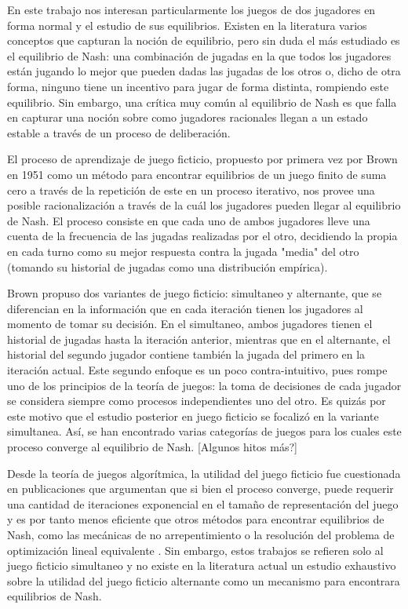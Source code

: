 En este trabajo nos interesan particularmente los juegos de dos jugadores en forma normal y el estudio de sus equilibrios. Existen en la literatura varios conceptos que capturan la noción de equilibrio, pero sin duda el más estudiado es el equilibrio de Nash: una combinación de jugadas en la que todos los jugadores están jugando lo mejor que pueden dadas las jugadas de los otros o, dicho de otra forma, ninguno tiene un incentivo para jugar de forma distinta, rompiendo este equilibrio. Sin embargo, una crítica muy común al equilibrio de Nash es que falla en capturar una noción sobre como jugadores racionales llegan a un estado estable a través de un proceso de deliberación.

El proceso de aprendizaje de juego ficticio, propuesto por primera vez por Brown en 1951 \cite{brown:1951} como un método para encontrar equilibrios de un juego finito de suma cero \cite{libro:rubinstein} a través de la repetición de este en un proceso iterativo, nos provee una posible racionalización a través de la cuál los jugadores pueden llegar al equilibrio de Nash. El proceso consiste en que cada uno de ambos jugadores lleve una cuenta de la frecuencia de las jugadas realizadas por el otro, decidiendo la propia en cada turno como su mejor respuesta contra la jugada "media" del otro (tomando su historial de jugadas como una distribución empírica). 

Brown propuso dos variantes de juego ficticio: simultaneo y alternante, que se diferencian en la información que en cada iteración tienen los jugadores al momento de tomar su decisión. En el simultaneo, ambos jugadores tienen el historial de jugadas hasta la iteración anterior, mientras que en el alternante, el historial del segundo jugador contiene también la jugada del primero en la iteración actual. Este segundo enfoque es un poco contra-intuitivo, pues rompe uno de los principios de la teoría de juegos: la toma de decisiones de cada jugador se considera siempre como procesos independientes uno del otro. Es quizás por este motivo que el estudio posterior en juego ficticio se focalizó en la variante simultanea. Así, se han encontrado varias categorías de juegos para los cuales este proceso converge al equilibrio de Nash. [Algunos hitos más?]

Desde la teoría de juegos algorítmica, la utilidad del juego ficticio fue cuestionada en publicaciones que argumentan que si bien el proceso converge, puede requerir una cantidad de iteraciones exponencial en el tamaño de representación del juego y es por tanto menos eficiente que otros métodos para encontrar equilibrios de Nash, como las mecánicas de no arrepentimiento o la resolución del problema de optimización lineal equivalente \cite{modified:fp:linear}. Sin embargo, estos trabajos se refieren solo al juego ficticio simultaneo y no existe en la literatura actual un estudio exhaustivo sobre la utilidad del juego ficticio alternante como un mecanismo para encontrara equilibrios de Nash.

